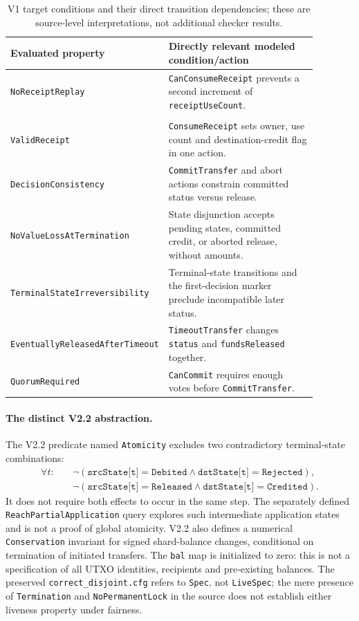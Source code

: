 \begin{table}[htbp]
\centering
\scriptsize
\caption{V1 target conditions and their direct transition dependencies;
these are source-level interpretations, not additional checker results.}
\label{tab:v1-guards}
\begin{tabular}{@{}p{0.38\linewidth}p{0.50\linewidth}@{}}
\hline
Evaluated property & Directly relevant modeled condition/action \\
\hline
\texttt{NoReceiptReplay} & \texttt{CanConsumeReceipt} prevents a second
increment of \texttt{receiptUseCount}. \\
\shortstack[l]{\texttt{DestinationCreditRequires}\\\texttt{ValidReceipt}} & \texttt{ConsumeReceipt}
sets owner, use count and destination-credit flag in one action. \\
\texttt{DecisionConsistency} & \texttt{CommitTransfer} and abort actions
constrain committed status versus release. \\
\texttt{NoValueLossAtTermination} & State disjunction accepts pending
states, committed credit, or aborted release, without amounts. \\
\texttt{TerminalStateIrreversibility} & Terminal-state transitions and the
first-decision marker preclude incompatible later status. \\
\texttt{EventuallyReleasedAfterTimeout} & \texttt{TimeoutTransfer} changes
\texttt{status} and \texttt{fundsReleased} together. \\
\texttt{QuorumRequired} & \texttt{CanCommit} requires enough votes before
\texttt{CommitTransfer}. \\
\hline
\end{tabular}
\end{table}

\paragraph{The distinct V2.2 abstraction.}
The V2.2 predicate named \texttt{Atomicity} excludes two contradictory
terminal-state combinations:
\[
\begin{split}
 \forall t:\quad&\neg(\texttt{srcState[t]}=\texttt{Debited}
                 \land\texttt{dstState[t]}=\texttt{Rejected}),\\
 &\neg(\texttt{srcState[t]}=\texttt{Released}
                 \land\texttt{dstState[t]}=\texttt{Credited}).
\end{split}
\]
It does not require both effects to occur in the same step. The separately
defined \texttt{ReachPartialApplication} query explores such intermediate
application states and is not a proof of global atomicity. V2.2 also defines
a numerical \texttt{Conservation} invariant for signed shard-balance changes,
conditional on termination of initiated transfers. The \texttt{bal} map is
initialized to zero: this is not a specification of all UTXO identities,
recipients and pre-existing balances. The preserved
\texttt{correct\_disjoint.cfg} refers to \texttt{Spec}, not
\texttt{LiveSpec}; the mere presence of \texttt{Termination} and
\texttt{NoPermanentLock} in the source does not establish either liveness
property under fairness.

